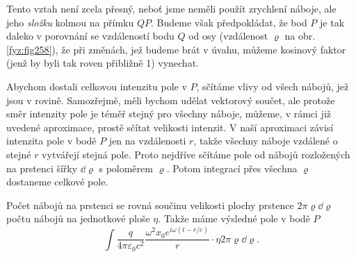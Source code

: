     Tento vztah není zcela přesný, neboť jsme neměli použít zrychlení náboje, ale jeho 
    \emph{složku} kolmou na přímku \(QP\). Budeme však předpokládat, že bod \(P\) je tak daleko v 
    porovnání se vzdáleností bodu \(Q\) od osy (vzdálenost \(\varrho\) na obr. \ref{fyz:fig258}), 
    že při změnách, jež budeme brát v úvahu, můžeme kosinový faktor (jenž by byli tak roven 
    přibližně \num{1}) vynechat.
    
    Abychom dostali celkovou intenzitu pole v \(P\), sčítáme vlivy od všech nábojů, jež jsou v 
    rovině. Samozřejmě, měli bychom udělat vektorový součet, ale protože směr intenzity pole je 
    téměř stejný pro všechny náboje, můžeme, v rámci již uvedené aproximace, prostě sčítat 
    velikosti intenzit. V naší aproximaci závisí intenzita pole v bodě \(P\) jen na vzdálenosti 
    \(r\), takže všechny náboje vzdálené o stejné \(r\) vytvářejí stejná pole. Proto nejdříve 
    sčítáme pole od nábojů rozložených na prstenci šířky \(\dd{\varrho}\) s poloměrem \(\varrho\). 
    Potom integrací přes všechna \(\varrho\) dostaneme celkové pole.
    
    Počet nábojů na prstenci se rovná součinu velikosti plochy prstence \(2\pi\varrho\dd{\varrho}\) 
    počtu nábojů na jednotkové ploše \(\eta\). Takže máme výsledné pole v bodě \(P\)
    \begin{equation}\label{fyz:eq333}
      \int\frac{q}{4\pi\varepsilon_0c^2}
      \frac{\omega^2x_0e^{i\omega(t-r/c)}}{r}
      \cdot\eta2\pi\varrho\dd{\varrho}.
    \end{equation}
    
